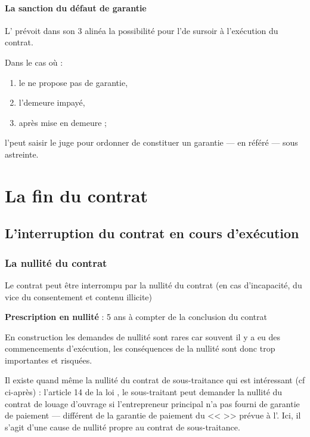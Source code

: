 				\paragraph{La sanction du défaut de garantie} L' prévoit dans son 3\ieme{} alinéa la possibilité pour l'\E de sursoir à l'exécution du contrat.

				Dans le cas où :
				\begin{enumerate}
					\item le \Mo ne propose pas de garantie,
					\item l'\E demeure impayé,
					\item après mise en demeure ;
				\end{enumerate}
				l'\E peut saisir le juge pour ordonner de constituer un garantie --- en référé --- sous astreinte.

	\section{La fin du contrat}

		\subsection{L'interruption du contrat en cours d'exécution}

			\subsubsection{La nullité du contrat}

				Le contrat peut être interrompu par la nullité du contrat (en cas d’incapacité, du vice du consentement et contenu illicite)

				\textbf{Prescription en nullité} : 5 ans à compter de la conclusion du contrat


				En construction les demandes de nullité sont rares car souvent il y a eu des commencements d’exécution, les conséquences de la nullité sont donc trop importantes et risquées.

				Il existe quand même la nullité du contrat de sous-traitance qui est intéressant (cf ci-après) : l'article 14 de la loi , le sous-traitant peut demander la nullité du contrat de louage d’ouvrage si l’entrepreneur principal n’a pas fourni de garantie de paiement --- différent de la garantie de paiement du << \Mo >> prévue à l'.
				Ici, il s’agit d’une cause de nullité propre au contrat de sous-traitance.




